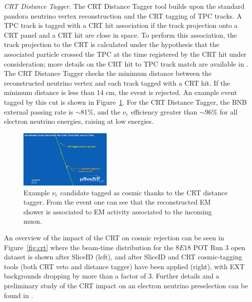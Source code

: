 \emph{CRT Distance Tagger.} 
The CRT Distance Tagger tool builds upon the standard pandora neutrino vertex reconstruction and the CRT tagging of TPC tracks. A TPC track is tagged with a CRT hit association if the track projection onto a CRT panel and a CRT hit are close in space. 
To perform this association, the track projection to the CRT is calculated under the hypothesis that the associated particle crossed the TPC at the time registered by the CRT hit under consideration; more details on the CRT hit to TPC track match are available in \cite{bib:CRTPresel_Technote}.  The CRT Distance Tagger checks the minimum distance between the reconstructed neutrino vertex and each track tagged with a CRT hit. If the minimum distance is less than 14 cm, the event is rejected. An example event tagged by this cut is shown in Figure~\ref{fig:crtdist00}.  For the CRT Distance Tagger, the BNB external passing rate is $\sim$81\%,  and the $\nu_e$ efficiency greater than $\sim$96\% for all electron neutrino energies, raising at low energies. \\
 
\begin{figure}[h!]
\centering
\includegraphics[width=0.4\textwidth]{NuId-Ch2/Images/crttagger_01.png}
\caption{Example $\nu_e$ candidate tagged as cosmic thanks to the CRT distance tagger. From the event one can see that the reconstructed EM shower is associated to EM activity associated to the incoming muon.}
\label{fig:crtdist00}
\end{figure}

An overview of the impact of the CRT on cosmic rejection can be seen in Figure~\ref{fig:crt} where the beam-time distribution for the $8E18$ POT Run 3 open dataset is shown after SliceID (left), and after SliceID and CRT cosmic-tagging tools (both CRT veto and distance tagger) have been applied (right), with EXT backgrounds dropping by more than a factor of 3.
Further details and a preliminary study of the CRT  impact on an electron neutrino preselection can be found in \cite{bib:CRTPresel_Technote}. 

